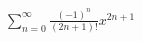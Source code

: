 \documentclass[preview]{standalone}
\begin{document}
\begin{align*}
\sum_{n=0}^{\infty} \frac{(-1)^n}{(2 n+1) !} x^{2 n+1}
\end{align*}
\end{document}
